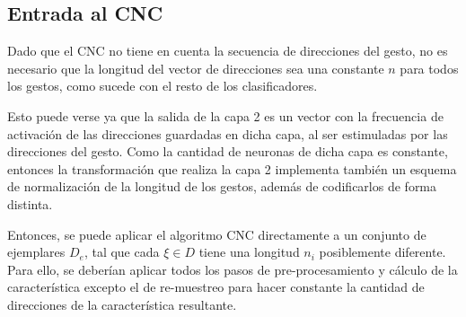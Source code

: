 \subsection{Entrada al CNC}

Dado que el CNC no tiene en cuenta la secuencia de direcciones del gesto, no es necesario que la longitud del vector de direcciones sea una constante $n$ para todos los gestos, como sucede con el resto de los clasificadores. 

Esto puede verse ya que la salida de la capa 2 es un vector con la frecuencia de activación de las direcciones guardadas en dicha capa, al ser estimuladas por las direcciones del gesto. Como la cantidad de neuronas de dicha capa es constante, entonces la transformación que realiza la capa 2 implementa también un esquema de normalización de la longitud de los gestos, además de codificarlos de forma distinta.

Entonces, se puede aplicar el algoritmo CNC directamente a un conjunto de ejemplares $D_e$, tal que cada $\xi \in D$ tiene una longitud $n_i$ posiblemente diferente. Para ello, se deberían aplicar todos los pasos de pre-procesamiento y cálculo de la característica excepto el de re-muestreo para hacer constante la cantidad de direcciones de la característica resultante.

